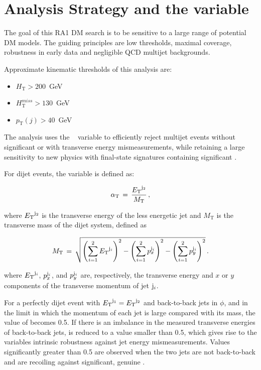 \section{Analysis Strategy and the \alphat variable}

The goal of this RA1 DM search is to be sensitive to a large range of potential DM models. The guiding principles are low thresholds, maximal coverage, robustness in early data and negligible QCD multijet backgrounds.

Approximate kinematic thresholds of this analysis are:

\begin{itemize}
   \item  $H_\textrm{T}>200$~GeV
   \item  $H^{miss}_\textrm{T}>130$~GeV
   \item  $p_\textrm{T}(j)>40$~GeV
\end{itemize}

The analysis uses the \alphat~\cite{Randall:2008rw, CMS:2008vya, CMS-PAS-SUS-09-001} variable to
 efficiently reject multijet events without significant \met or with transverse energy mismeasurements, 
while retaining a large sensitivity to new physics with final-state signatures containing significant \met.

For dijet events, the \alphat variable is defined as:

\begin{equation}
\label{eq:alphat}
\alpha_{\text{T}}\, =\, \frac{{E_{\text T}}^{{\rm j}_2}}{M_\text{T}} \, ,
\end{equation}

where ${E_{\text T}}^{\rm j_2}$ is the transverse energy of the less energetic
jet and $M_\text{T}$ is the transverse mass of the dijet system,
defined as

\begin{equation}
  \label{eq:mt}
  M_\text{T}\, = \,\sqrt{ \left( \sum_{i=1}^2 {E_{\text T}}^{{\rm j}_i}
    \right)^2 - \left( \sum_{i=1}^2 p_x^{{\rm j}_i} \right)^2 - \left(
      \sum_{i=1}^2 p_y^{{\rm j}_i} \right)^2} \, .
\end{equation}

where ${E_{\text T}}^{{\rm j}_i}$, $p_x^{{\rm j}_i}$, and $p_y^{{\rm j}_i}$ are,
respectively, the transverse energy and $x$ or $y$ components of the
transverse momentum of jet ${\rm j}_i$.

For a perfectly dijet event with ${E_{\text T}}^{\rm j_1} = {E_{\text T}}^{\rm j_2}$ and back-to-back jets in $\phi$, and in the limit in which the
momentum of each jet is large compared with its mass, the value of \alphat becomes 0.5. If there is an imbalance in the measured
transverse energies of back-to-back jets, \alphat is reduced to a value smaller than 0.5, which gives rise to the variables intrinsic
robustness against jet energy mismeasurements. Values significantly greater than 0.5 are observed when the two jets are not 
back-to-back and are recoiling against significant, genuine \met.

